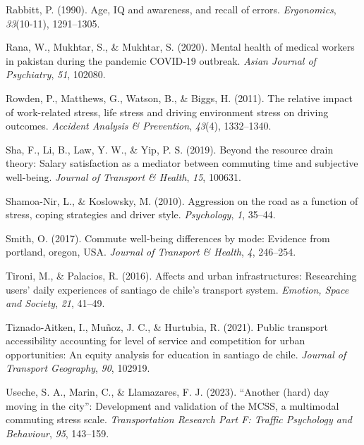 \documentclass[
11pt, %
oneside, %
english, %
singlespacing, %
]{macthesis} %
\newlength{\cslhangindent}
\newenvironment{CSLReferences}[2] %
 {%
  \setlength{\parindent}{0pt}
  \ifodd #1 \everypar{\setlength{\hangindent}{\cslhangindent}}\ignorespaces\fi
  \ifnum #2 > 0
  \setlength{\parskip}{#2\baselineskip}
  \fi
 }%
 {}
\begin{document}
\begin{CSLReferences}{1}{0}
\leavevmode{}%
Rabbitt, P. (1990). Age, IQ and awareness, and recall of errors. \emph{Ergonomics}, \emph{33}(10-11), 1291--1305.

\leavevmode{}%
Rana, W., Mukhtar, S., \& Mukhtar, S. (2020). Mental health of medical workers in pakistan during the pandemic COVID-19 outbreak. \emph{Asian Journal of Psychiatry}, \emph{51}, 102080.

\leavevmode{}%
Rowden, P., Matthews, G., Watson, B., \& Biggs, H. (2011). The relative impact of work-related stress, life stress and driving environment stress on driving outcomes. \emph{Accident Analysis \& Prevention}, \emph{43}(4), 1332--1340.

\leavevmode{}%
Sha, F., Li, B., Law, Y. W., \& Yip, P. S. (2019). Beyond the resource drain theory: Salary satisfaction as a mediator between commuting time and subjective well-being. \emph{Journal of Transport \& Health}, \emph{15}, 100631.

\leavevmode{}%
Shamoa-Nir, L., \& Koslowsky, M. (2010). Aggression on the road as a function of stress, coping strategies and driver style. \emph{Psychology}, \emph{1}, 35--44.

\leavevmode{}%
Smith, O. (2017). Commute well-being differences by mode: Evidence from portland, oregon, USA. \emph{Journal of Transport \& Health}, \emph{4}, 246--254.

\leavevmode{}%
Tironi, M., \& Palacios, R. (2016). Affects and urban infrastructures: Researching users' daily experiences of santiago de chile's transport system. \emph{Emotion, Space and Society}, \emph{21}, 41--49.

\leavevmode{}%
Tiznado-Aitken, I., Muñoz, J. C., \& Hurtubia, R. (2021). Public transport accessibility accounting for level of service and competition for urban opportunities: An equity analysis for education in santiago de chile. \emph{Journal of Transport Geography}, \emph{90}, 102919.

\leavevmode{}%
Useche, S. A., Marin, C., \& Llamazares, F. J. (2023). {``Another (hard) day moving in the city''}: Development and validation of the MCSS, a multimodal commuting stress scale. \emph{Transportation Research Part F: Traffic Psychology and Behaviour}, \emph{95}, 143--159.


\end{CSLReferences}
\end{document}
